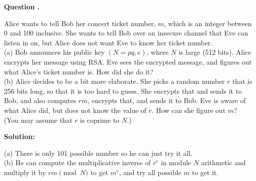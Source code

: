 \documentclass[12pt]{article}
\newcounter{questionnumber}
\newenvironment{question}[1][]{\stepcounter{questionnumber}\par\noindent\textbf{Question \thequestionnumber. #1}\par}{\par}
\newenvironment{solution}{\par\noindent\textbf{Solution:}\par}{\par\vspace{1em}}
\begin{document}
\begin{question}
    Alice wants to tell Bob her concert ticket number, $m$, which is an integer between 0 and 100 inclusive. She wants to tell Bob over an insecure channel that Eve can listen in on, but Alice does not want Eve to know her ticket number.\\
    (a) Bob announces his public key $(N = pq, e)$, where $N$ is large (512 bits). Alice encrypts her message using RSA. Eve sees the encrypted message, and figures out what Alice's ticket number is. How did she do it?\\
    (b) Alice decides to be a bit more elaborate. She picks a random number $r$ that is 256 bits long, so that it is too hard to guess. She encrypts that and sends it to Bob, and also computes $rm$, encrypts that, and sends it to Bob. Eve is aware of what Alice did, but does not know the value of $r$. How can she figure out $m$? (You may assume that $r$ is coprime to $N$.)
\end{question}
\begin{solution}
    \noindent
    (a) There is only 101 possible number so he can just try it all.\\
    (b) He can compute the multiplicative inverse of $r^e$ in module $N$ arithmetic and multiply it by $rm\pmod{N}$ to get $m^e$, and try all possible $m$ to get it.
\end{solution}
\end{document}
